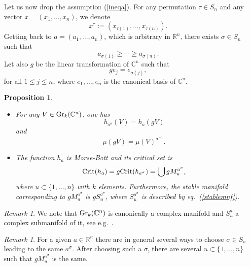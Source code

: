 \documentclass[12pt]{amsart}
\newtheorem{prop}[thm]{Proposition}
\theoremstyle{definition}
\theoremstyle{remark}
\newtheorem{rem}[thm]{Remark}
\newcommand{\RR}{\mathbb R}
\newcommand{\CC}{\mathbb C}
\begin{document}
Let us now drop the assumption (\ref{ineqa}). For any permutation $\tau \in S_n$ and any vector $x=(x_1, \ldots, x_n)$, we denote  
$$x^\tau:=(x_{\tau(1)}, \ldots, x_{\tau(n)}).$$ 
Getting back to $a=(a_1, \ldots, a_n)$, which is arbitrary in $\RR^n$, there exists $\sigma\in S_n$ such that
 \begin{equation}\label{orfera}a_{\sigma(1)} \ge \cdots \ge a_{\sigma(n)}.\end{equation}
 Let also $g$ be the linear transformation of $\CC^n$ such that
 $$ge_j=e_{\sigma(j)},$$
 for all $1\le j \le n$, where $e_1, \ldots, e_n$ is the canonical basis of $\CC^n$. 
 
 \begin{prop}\label{critgen}
\begin{itemize}
\item[(i)] For any $V\in {\rm Gr}_k(\CC^n)$, one has 
\begin{equation} \label{ha} h_{{a}^\sigma}(V)=h_a(gV)\end{equation}
and
\begin{equation} \label{mug} \mu(gV)=\mu(V)^{\sigma^{-1}}.\end{equation}
\item[(ii)] 
The function $h_a$ is Morse-Bott and its critical set  is  
\begin{equation}\label{ch}{\rm Crit}(h_a)=g{\rm Crit}(h_{{a}^\sigma})=\bigcup gM_{u}^{{a}^\sigma},\end{equation}
where ${u\subset \{1,\ldots, n\}}$ with $k$ elements.  
Furthermore, the  stable manifold corresponding to $gM_{u}^{{a}^\sigma}$ is $gS_{u}^{{a}^\sigma}$, where
$S_{u}^{{a}^\sigma}$ is described by eq.~(\ref{stablemnf}). 
\end{itemize}
\end{prop}

 
 
 \begin{rem}\label{complex} We note that ${\rm Gr}_k(\CC^n)$ is canonically a complex manifold and  $S_{u}^a$  a complex submanifold of it, see e.g.~\cite[p.~170]{Gu}. %
\end{rem}


\begin{rem}\label{ambig2} 
For a given $a\in \RR^n$ there are in general several ways to choose $\sigma\in S_n$ leading to the same $a^\sigma$.
After choosing such a $\sigma$, there are several $u\subset \{1, \ldots, n\}$ such that $gM_{u}^{{a}^\sigma}$ is the same.  
\end{rem}
\end{document}
